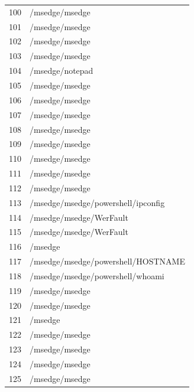 \documentclass[a4paper,twoside,12pt]{book}
\begin{document}
\begin{appendices}
\begin{table}
\begin{tabular}{ll}
		100 &                                     /msedge/msedge \\
		101 &                                     /msedge/msedge \\
		102 &                                     /msedge/msedge \\
		103 &                                     /msedge/msedge \\
		104 &                                    /msedge/notepad \\
		105 &                                     /msedge/msedge \\
		106 &                                     /msedge/msedge \\
		107 &                                     /msedge/msedge \\
		108 &                                     /msedge/msedge \\
		109 &                                     /msedge/msedge \\
		110 &                                     /msedge/msedge \\
		111 &                                     /msedge/msedge \\
		112 &                                     /msedge/msedge \\
		113 &                 /msedge/msedge/powershell/ipconfig \\
		114 &                            /msedge/msedge/WerFault \\
		115 &                            /msedge/msedge/WerFault \\
		116 &                                            /msedge \\
		117 &                 /msedge/msedge/powershell/HOSTNAME \\
		118 &                   /msedge/msedge/powershell/whoami \\
		119 &                                     /msedge/msedge \\
		120 &                                     /msedge/msedge \\
		121 &                                            /msedge \\
		122 &                                     /msedge/msedge \\
		123 &                                     /msedge/msedge \\
		124 &                                     /msedge/msedge \\
		125 &                                     /msedge/msedge \\

\end{tabular}
\end{table}
\end{appendices}
\end{document}
